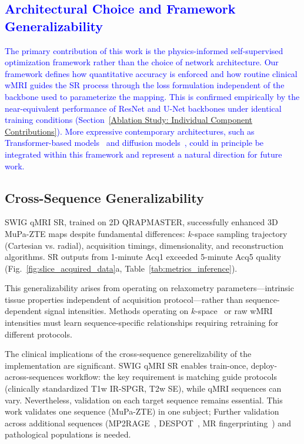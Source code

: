 \documentclass[journal,twoside,web]{ieeecolor}
\newcommand{\added}[1]{\textcolor{blue}{#1}}      %
\begin{document}
\subsection{\added{Architectural Choice and Framework Generalizability}}
\added{The primary contribution of this work is the physics-informed self-supervised optimization framework rather than the choice of network architecture. Our framework defines how quantitative accuracy is enforced and how routine clinical wMRI guides the SR process through the loss formulation independent of the backbone used to parameterize the mapping. This is confirmed empirically by the near-equivalent performance of ResNet and U-Net backbones under 
identical training conditions (Section~\ref{Ablation Study: Individual Component Contributions}). More expressive contemporary architectures, such as Transformer-based models~\cite{.....} and diffusion models~\cite{......}, could in principle be integrated within 
this framework and represent a natural direction for future work.}

\subsection{Cross-Sequence Generalizability}
SWIG qMRI SR, trained on 2D QRAPMASTER, successfully enhanced 3D MuPa-ZTE maps despite fundamental differences: $k$-space sampling trajectory (Cartesian vs. radial), acquisition timings, dimensionality, and reconstruction algorithms. SR outputs from 1-minute Acq1 exceeded 5-minute Acq5 quality (Fig.~\ref{fig:slice_acquired_data}a, Table~\ref{tab:metrics_inference}).

This generalizability arises from operating on relaxometry parameters—intrinsic tissue properties independent of acquisition protocol—rather than sequence-dependent signal intensities. Methods operating on $k$-space~\cite{b3} or raw wMRI intensities must learn sequence-specific relationships requiring retraining for different protocols.

The clinical implications of the cross-sequence generelizability of the implementation are significant. SWIG qMRI SR enables train-once, deploy-across-sequences workflow: the key requirement is matching guide protocols (clinically standardized T1w IR-SPGR, T2w SE), while qMRI sequences can vary. Nevertheless, validation on each target sequence remains essential. This work validates one sequence (MuPa-ZTE) in one subject; Further validation across additional sequences (MP2RAGE~\cite{b26}, DESPOT~\cite{b27}, MR fingerprinting~\cite{b16}) and pathological populations is needed.
\end{document}
